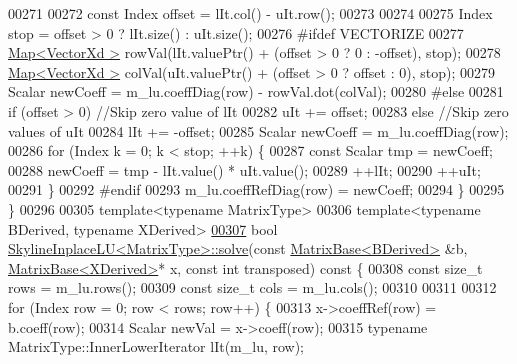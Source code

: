 \begin{DoxyCode}
00271 
00272         \textcolor{keyword}{const} Index offset = lIt.col() - uIt.row();
00273 
00274 
00275         Index stop = offset > 0 ? lIt.size() : uIt.size();
00276 \textcolor{preprocessor}{#ifdef VECTORIZE}
00277         \hyperlink{group___core___module_class_eigen_1_1_map}{Map<VectorXd >} rowVal(lIt.valuePtr() + (offset > 0 ? 0 : -offset), stop);
00278         \hyperlink{group___core___module_class_eigen_1_1_map}{Map<VectorXd >} colVal(uIt.valuePtr() + (offset > 0 ? offset : 0), stop);
00279         Scalar newCoeff = m\_lu.coeffDiag(row) - rowVal.dot(colVal);
00280 \textcolor{preprocessor}{#else}
00281         \textcolor{keywordflow}{if} (offset > 0) \textcolor{comment}{//Skip zero value of lIt}
00282             uIt += offset;
00283         \textcolor{keywordflow}{else} \textcolor{comment}{//Skip zero values of uIt}
00284             lIt += -offset;
00285         Scalar newCoeff = m\_lu.coeffDiag(row);
00286         \textcolor{keywordflow}{for} (Index k = 0; k < stop; ++k) \{
00287             \textcolor{keyword}{const} Scalar tmp = newCoeff;
00288             newCoeff = tmp - lIt.value() * uIt.value();
00289             ++lIt;
00290             ++uIt;
00291         \}
00292 \textcolor{preprocessor}{#endif}
00293         m\_lu.coeffRefDiag(row) = newCoeff;
00294     \}
00295 \}
00296 
00305 \textcolor{keyword}{template}<\textcolor{keyword}{typename} MatrixType>
00306 \textcolor{keyword}{template}<\textcolor{keyword}{typename} BDerived, \textcolor{keyword}{typename} XDerived>
\hyperlink{class_eigen_1_1_skyline_inplace_l_u_a53c846d76559221d2bcf336a2da4d68f}{00307} \textcolor{keywordtype}{bool} \hyperlink{class_eigen_1_1_skyline_inplace_l_u_a53c846d76559221d2bcf336a2da4d68f}{SkylineInplaceLU<MatrixType>::solve}(\textcolor{keyword}{const} 
      \hyperlink{group___core___module_class_eigen_1_1_matrix_base}{MatrixBase<BDerived>} &b, \hyperlink{group___core___module_class_eigen_1_1_matrix_base}{MatrixBase<XDerived>}* x, \textcolor{keyword}{const} \textcolor{keywordtype}{int} 
      transposed)\textcolor{keyword}{ const }\{
00308     \textcolor{keyword}{const} \textcolor{keywordtype}{size\_t} rows = m\_lu.rows();
00309     \textcolor{keyword}{const} \textcolor{keywordtype}{size\_t} cols = m\_lu.cols();
00310 
00311 
00312     \textcolor{keywordflow}{for} (Index row = 0; row < rows; row++) \{
00313         x->coeffRef(row) = b.coeff(row);
00314         Scalar newVal = x->coeff(row);
00315         \textcolor{keyword}{typename} MatrixType::InnerLowerIterator lIt(m\_lu, row);

\end{DoxyCode}
